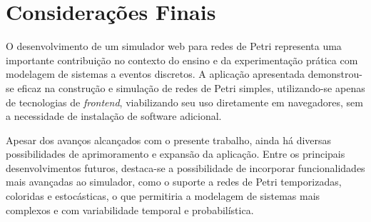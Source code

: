 \documentclass[
	12pt,				%
	openright,			%
	oneside,			%
	a4paper,			%
	english,			%
	brazil				%
	]{abntex2}
\begin{document}








\chapter{Considerações Finais} \label{cap:resultados}

O desenvolvimento de um simulador web para redes de Petri representa uma importante contribuição no contexto do ensino e da experimentação prática com modelagem de sistemas a eventos discretos. A aplicação apresentada demonstrou-se eficaz na construção e simulação de redes de Petri simples, utilizando-se apenas de tecnologias de \textit{frontend}, viabilizando seu uso diretamente em navegadores, sem a necessidade de instalação de software adicional.

Apesar dos avanços alcançados com o presente trabalho, ainda há diversas possibilidades de aprimoramento e expansão da aplicação. Entre os principais desenvolvimentos futuros, destaca-se a possibilidade de incorporar funcionalidades mais avançadas ao simulador, como o suporte a redes de Petri temporizadas, coloridas e estocásticas, o que permitiria a modelagem de sistemas mais complexos e com variabilidade temporal e probabilística.
\end{document}
